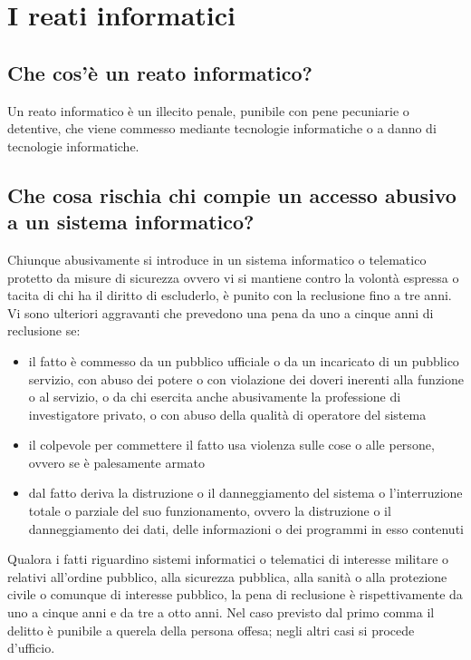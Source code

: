 \newpage
\section{I reati informatici}
\subsection{Che cos'è un reato informatico?}
Un reato informatico è un illecito penale, punibile con pene pecuniarie o detentive, che viene commesso mediante tecnologie informatiche o a danno di tecnologie informatiche.
\subsection{Che cosa rischia chi compie un accesso abusivo a un sistema informatico?}
Chiunque abusivamente si introduce in un sistema informatico o telematico protetto da misure di sicurezza ovvero vi si mantiene contro la volontà espressa o tacita di chi ha il diritto di escluderlo, è punito con la reclusione fino a tre anni.
Vi sono ulteriori aggravanti che prevedono una pena da uno a cinque anni di reclusione se:
\begin{itemize}
    \item il fatto è commesso da un pubblico ufficiale o da un incaricato di un pubblico servizio, con abuso dei potere o con violazione dei doveri inerenti alla funzione o al servizio, o da chi esercita anche abusivamente la professione di investigatore privato, o con abuso della qualità di operatore del sistema 
    \item il colpevole per commettere il fatto usa violenza sulle cose o alle persone, ovvero se è palesamente armato
    \item dal fatto deriva la distruzione o il danneggiamento del sistema o l'interruzione totale o parziale del suo funzionamento, ovvero la distruzione o il danneggiamento dei dati, delle informazioni o dei programmi in esso contenuti
\end{itemize}
Qualora i fatti riguardino sistemi informatici o telematici di interesse militare o relativi all'ordine pubblico, alla sicurezza pubblica, alla sanità o alla protezione civile o comunque di interesse pubblico, la pena di reclusione è rispettivamente da uno a cinque anni e da tre a otto anni.
\newline
Nel caso previsto dal primo comma il delitto è punibile a querela della persona offesa; negli altri casi si procede d'ufficio.
